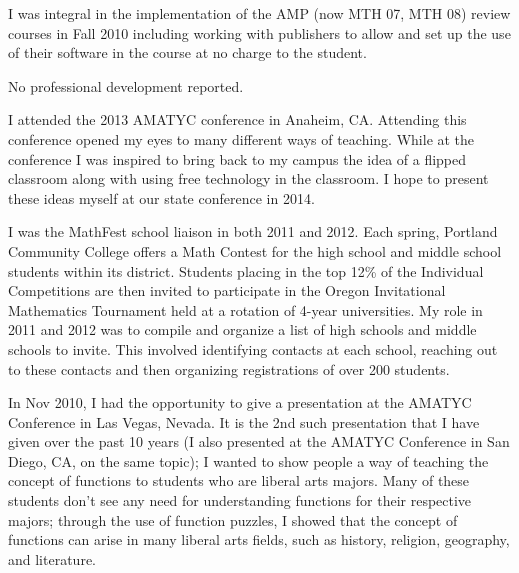 \begin{description}[style=nextline]
	I was integral in the implementation of the AMP (now MTH 07, MTH 08) review
	courses in Fall 2010 including working with publishers to allow and set up the
	use of their software in the course at no charge to the student.

	\item[Will Freeman (Full-time Instructor, Sylvania Campus)]

        No professional development reported.

	\item[Wendy Fresh (Full-time Instructor, Rock Creek Campus)]
	I attended the 2013 AMATYC conference in Anaheim, CA.  Attending this
	conference opened my eyes to many different ways of teaching.  While at the
	conference I was inspired to bring back to my campus the idea of a
	flipped classroom along with using free technology in the classroom.  I
	hope to present these ideas myself at our state conference in 2014.

	I was the MathFest school liaison in both 2011 and 2012.  Each spring, Portland
	Community College offers a Math Contest for the high school and middle school
	students within its district.  Students placing in the top 12\% of the
	Individual Competitions are then invited to participate in the Oregon
	Invitational Mathematics Tournament held at a rotation of 4-year universities.
	My role in 2011 and 2012 was to compile and organize a list of high schools and
	middle schools to invite.  This involved identifying contacts at each school,
	reaching out to these contacts and then organizing registrations of over 200
	students.

	\item[Matthew Funk (Faculty Chair, Southeast Campus)]
	In Nov 2010, I had the opportunity to give a presentation at the AMATYC
	Conference in Las Vegas, Nevada.  It is the 2nd such presentation that I have
	given over the past 10 years (I also presented at the AMATYC Conference in San
	Diego, CA, on the same topic); I wanted to show people a way of teaching the
	concept of functions to students who are liberal arts majors.  Many of these
	students don't see any need for understanding functions for their respective
	majors; through the use of function puzzles, I showed that the concept of
	functions can arise in many liberal arts fields, such as history, religion,
	geography, and literature.


\end{description}
